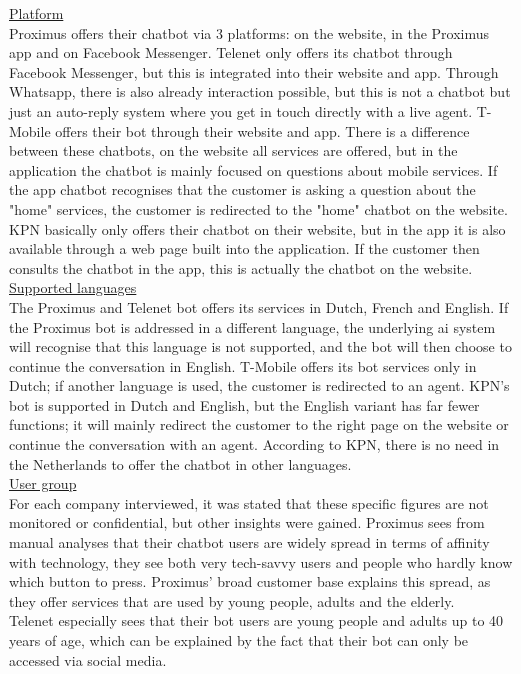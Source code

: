 \break
\ul{Platform}\\
Proximus offers their chatbot via 3 platforms: on the website, in the Proximus app and on Facebook Messenger. Telenet only offers its chatbot through Facebook Messenger, but this is integrated into their website and app. Through Whatsapp, there is also already interaction possible, but this is not a chatbot but just an auto-reply system where you get in touch directly with a live agent. T-Mobile offers their bot through their website and app. There is a difference between these chatbots, on the website all services are offered, but in the application the chatbot is mainly focused on questions about mobile services. If the app chatbot recognises that the customer is asking a question about the "home" services, the customer is redirected to the "home" chatbot on the website. KPN basically only offers their chatbot on their website, but in the app it is also available through a web page built into the application. If the customer then consults the chatbot in the app, this is actually the chatbot on the website.\\
\break
\ul{Supported languages}\\
The Proximus and Telenet bot offers its services in Dutch, French and English. If the Proximus bot is addressed in a different language, the underlying \acrshort{ai} system will recognise that this language is not supported, and the bot will then choose to continue the conversation in English. T-Mobile offers its bot services only in Dutch; if another language is used, the customer is redirected to an agent. KPN's bot is supported in Dutch and English, but the English variant has far fewer functions; it will mainly redirect the customer to the right page on the website or continue the conversation with an agent. According to KPN, there is no need in the Netherlands to offer the chatbot in other languages.\\
\break
\ul{User group}\\
For each company interviewed, it was stated that these specific figures are not monitored or confidential, but other insights were gained. Proximus sees from manual analyses that their chatbot users are widely spread in terms of affinity with technology, they see both very tech-savvy users and people who hardly know which button to press. Proximus' broad customer base explains this spread, as they offer services that are used by young people, adults and the elderly.\\
\break
Telenet especially sees that their bot users are young people and adults up to 40 years of age, which can be explained by the fact that their bot can only be accessed via social media.\\
